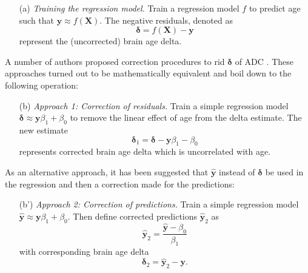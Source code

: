 \documentclass[utf8]{frontiersSCNS} %
\renewcommand{\d}{\boldsymbol{\delta}}
\newcommand{\X}{\mathbf{X}}
\newcommand{\y}{\mathbf{y}}
\newcommand{\yh}{\mathbf{\hat{y}}}
\begin{document}
\begin{enumerate}
    \item[(a)]\textit{Training the regression model.} Train a regression model $f$ to predict age such that $\y \approx f(\X)$. The negative residuals, denoted as 
    \begin{equation}\label{eq:twostage1}
         \d = f(\X) - \y
    \end{equation}
    represent the (uncorrected) brain age delta. 
\end{enumerate}

A number of authors proposed correction procedures to rid $\d$ of ADC  \citep{Le2018ABrainAGE,Smith2019EstimationImaging,Beheshti2019Bias-adjustmentScheme}. These approaches turned out to be mathematically equivalent and boil down to the following operation:
    
\begin{enumerate}
    \setcounter{enumi}{1}
    \item[(b)]\textit{Approach 1: Correction of residuals.} Train a simple regression model $\d\approx\y\beta_1 + \beta_0$ to remove the linear effect of age from the delta estimate. The new estimate
    \begin{equation}\label{eq:approach1_d}
         \d_1 = \d - \y\beta_1 - \beta_0
    \end{equation}
    represents corrected brain age delta which is uncorrelated with age.
\end{enumerate}

As an alternative approach, it has been suggested that $\yh$ instead of $\d$ be used in the regression  \citep{Cole2018BrainMortality,deLange2020Commentary:Prediction} and then a correction made for the predictions:

\begin{enumerate}
    \setcounter{enumi}{1}
    \item[(b')]\textit{Approach 2: Correction of predictions.} Train a simple regression model $\yh\approx\y\beta_1 + \beta_0$. Then define corrected predictions $\yh_2$ as 
    \begin{equation}\label{eq:approach2_y}
         \yh_2 = \frac{\yh - \beta_0}{\beta_1}
    \end{equation}
    with corresponding brain age delta
    \begin{equation}\label{eq:approach2_d}
         \d_2 = \yh_2 - \y.
    \end{equation}
\end{enumerate}
\end{document}
